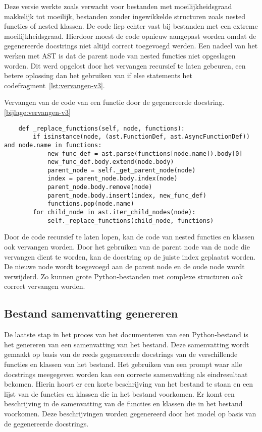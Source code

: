 Deze versie werkte zoals verwacht voor bestanden met moeilijkheidsgraad makkelijk tot moeilijk, bestanden zonder ingewikkelde structuren zoals nested functies of nested klassen.
De code liep echter vast bij bestanden met een extreme moeilijkheidsgraad.
Hierdoor moest de code opnieuw aangepast worden omdat de gegenereerde docstrings niet altijd correct toegevoegd werden.
Een nadeel van het werken met AST is dat de parent node van nested functies niet opgeslagen worden.
Dit werd opgelost door het vervangen recursief te laten gebeuren, een betere oplossing dan het gebruiken van if else statements het codefragment~\ref{lst:vervangen-v3}.

\begin{listing}
    \caption[Code voor het vervangen van een docstring v2]{Vervangen van de code van een functie door de gegenereerde docstring. \ref{bijlage:vervangen-v3}}
    \label{lst:vervangen-v3}
    \begin{verbatim}
    def _replace_functions(self, node, functions):
        if isinstance(node, (ast.FunctionDef, ast.AsyncFunctionDef)) and node.name in functions:
            new_func_def = ast.parse(functions[node.name]).body[0]
            new_func_def.body.extend(node.body)
            parent_node = self._get_parent_node(node)
            index = parent_node.body.index(node)
            parent_node.body.remove(node)
            parent_node.body.insert(index, new_func_def)
            functions.pop(node.name)
        for child_node in ast.iter_child_nodes(node):
            self._replace_functions(child_node, functions)
    \end{verbatim}
\end{listing}

Door de code recursief te laten lopen, kan de code van nested functies en klassen ook vervangen worden.
Door het gebruiken van de parent node van de node die vervangen dient te worden, kan de docstring op de juiste index geplaatst worden.
De nieuwe node wordt toegevoegd aan de parent node en de oude node wordt verwijderd.
Zo kunnen grote Python-bestanden met complexe structuren ook correct vervangen worden.

\subsection{Bestand samenvatting genereren}
\label{sec:bestanddocumentatie-samenvatting}
De laatste stap in het proces van het documenteren van een Python-bestand is het genereren van een samenvatting van het bestand.
Deze samenvatting wordt gemaakt op basis van de reeds gegenereerde docstrings van de verschillende functies en klassen van het bestand.
Het gebruiken van een prompt waar alle docstrings meegegeven worden kan een correcte samenvatting als eindresultaat bekomen.
Hierin hoort er een korte beschrijving van het bestand te staan en een lijst van de functies en klassen die in het bestand voorkomen.
Er komt een beschrijving in de samenvatting van de functies en klassen die in het bestand voorkomen.
Deze beschrijvingen worden gegenereerd door het model op basis van de gegenereerde docstrings.

